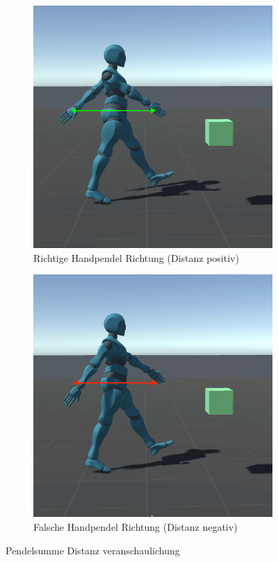\begin{figure}[H]
  \centering  
    \begin{subfigure}{.49\textwidth}
      \centering  
      \includegraphics[width=\textwidth]{img/hand_pendel_gut}
      \caption{Richtige Handpendel Richtung (Distanz positiv)}
      \label{fig:hand_pendel_gut}
    \end{subfigure}
    \begin{subfigure}{.49\textwidth}
      \centering  
      \includegraphics[width=\textwidth]{img/hand_pendel_schlecht}
      \caption{Falsche Handpendel Richtung (Distanz negativ)}
      \label{fig:hand_pendel_schlecht}
    \end{subfigure}
  \caption{Pendelsumme Distanz veranschaulichung}
  \label{fig:pendelsumme_distanz}
\end{figure}

